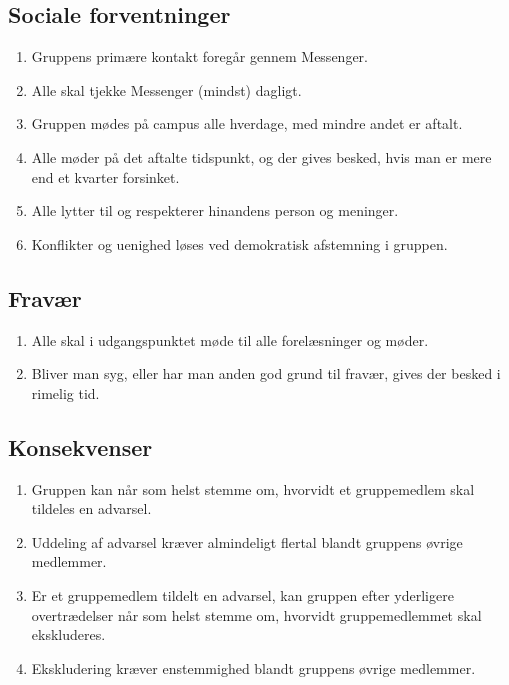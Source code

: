 \subsection*{Sociale forventninger}

\begin{enumerate}
  \item Gruppens primære kontakt foregår gennem Messenger.
  \item Alle skal tjekke Messenger (mindst) dagligt.
  \item Gruppen mødes på campus alle hverdage, med mindre andet er aftalt.
  \item Alle møder på det aftalte tidspunkt, og der gives besked, hvis man er mere end et kvarter forsinket.
  \item Alle lytter til og respekterer hinandens person og meninger.
  \item Konflikter og uenighed løses ved demokratisk afstemning i gruppen.
\end{enumerate}

\subsection*{Fravær}

\begin{enumerate}
  \item Alle skal i udgangspunktet møde til alle forelæsninger og møder.
  \item Bliver man syg, eller har man anden god grund til fravær, gives der besked i rimelig tid.
\end{enumerate}

\subsection*{Konsekvenser}

\begin{enumerate}
  \item Gruppen kan når som helst stemme om, hvorvidt et gruppemedlem skal tildeles en advarsel.
  \item Uddeling af advarsel kræver almindeligt flertal blandt gruppens øvrige medlemmer.
  \item Er et gruppemedlem tildelt en advarsel, kan gruppen efter yderligere overtrædelser når som helst stemme om, hvorvidt gruppemedlemmet skal ekskluderes.
  \item Ekskludering kræver enstemmighed blandt gruppens øvrige medlemmer.
\end{enumerate}

\renewcommand*{\theenumi}{\arabic{enumi}}
